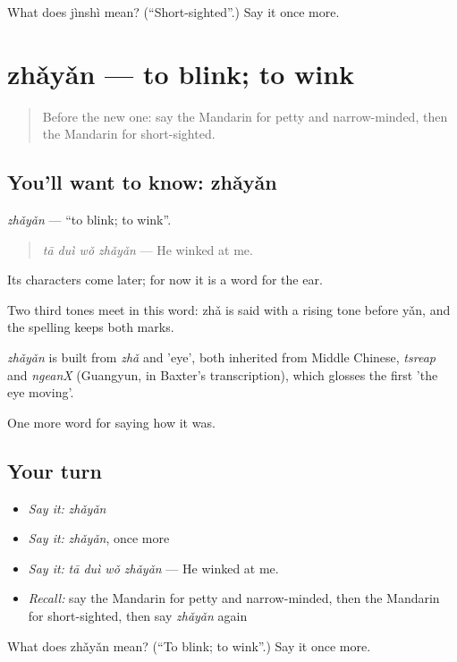 \begin{tcolorbox}[breakable,colback=teal!4,colframe=teal!35!black,title={Before you move on}]
What does jìnshì mean? (\textquotedblleft{}Short-sighted\textquotedblright{}.) Say it once more.
\end{tcolorbox}
\section[zhǎyǎn]{zhǎyǎn — to blink; to wink}

\label{lesson:ZH-C471-zhayan}



\begin{quote}
Before the new one: say the Mandarin for petty and narrow-minded, then the Mandarin for short-sighted.
\end{quote}

\subsection*{You'll want to know: zhǎyǎn}
\emph{zhǎyǎn} — \textquotedblleft{}to blink; to wink\textquotedblright{}.

\begin{quote}
\emph{tā duì wǒ zhǎyǎn} — He winked at me.
\end{quote}

Its characters come later; for now it is a word for the ear.

Two third tones meet in this word: zhǎ is said with a rising tone before yǎn, and the spelling keeps both marks.

\begin{cousinweb}
\emph{zhǎyǎn} is built from \emph{zhǎ} and  'eye', both inherited from Middle Chinese, \emph{tsreap} and \emph{ngeanX} (Guangyun, in Baxter's transcription), which glosses the first 'the eye moving'.
\end{cousinweb}

\begin{grammarlens}[title={What you've built}]
One more word for saying how it was.
\end{grammarlens}

\subsection*{Your turn}
\begin{itemize}
\raggedright
  \item \emph{Say it:} \emph{zhǎyǎn}
  \item \emph{Say it:} \emph{zhǎyǎn}, once more
  \item \emph{Say it:} \emph{tā duì wǒ zhǎyǎn} — He winked at me.
  \item \emph{Recall:} say the Mandarin for petty and narrow-minded, then the Mandarin for short-sighted, then say \emph{zhǎyǎn} again
\end{itemize}

\begin{tcolorbox}[breakable,colback=teal!4,colframe=teal!35!black,title={Before you move on}]
What does zhǎyǎn mean? (\textquotedblleft{}To blink; to wink\textquotedblright{}.) Say it once more.
\end{tcolorbox}
